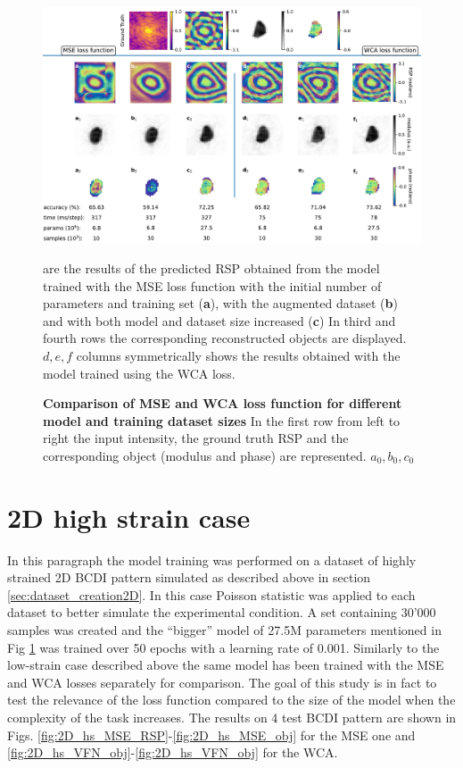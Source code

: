 \begin{figure}[H]
    \centering
    \includegraphics[width=\textwidth]{figures/Phasing/model_comparison.pdf}
    \caption{\textbf{Comparison of MSE and WCA loss function for different model and training dataset sizes} In the first 
    row from left to right the input intensity, the ground truth RSP and the corresponding object (modulus and phase) are 
    represented. \textbf{$a_0, b_0, c_0$}} are the results of the predicted RSP obtained from the model trained with the 
    MSE loss function with the initial number of parameters and training set (\textbf{a}), with the augmented dataset (\textbf{b})
    and with both model and dataset size increased (\textbf{c}) In third and fourth rows the corresponding reconstructed 
    objects are displayed. \textbf{$d, e, f$} columns symmetrically shows the results obtained with the model trained using the WCA loss. 
    \label{fig:loss_comparison}
\end{figure}

\section{2D high strain case}

In this paragraph the model training was performed on a dataset of highly strained 2D BCDI pattern simulated as described above  
in section \ref{sec:dataset_creation2D}. In this case Poisson statistic was applied to each dataset to better simulate 
the experimental condition. A set containing 30'000 samples was created and the ``bigger'' model of 27.5M parameters mentioned in Fig 
\ref{fig:loss_comparison} was trained over 50 epochs with a learning rate of 0.001. Similarly to the low-strain case 
described above the same model has been trained with the MSE and WCA losses separately for comparison. The goal of this 
study is in fact to test the relevance of the loss function compared to the size of the model when the complexity of the 
task increases. The results on 4 test BCDI pattern are shown in Figs. \ref{fig:2D_hs_MSE_RSP}-\ref{fig:2D_hs_MSE_obj} for the MSE
one and \ref{fig:2D_hs_VFN_obj}-\ref{fig:2D_hs_VFN_obj} for the WCA.

